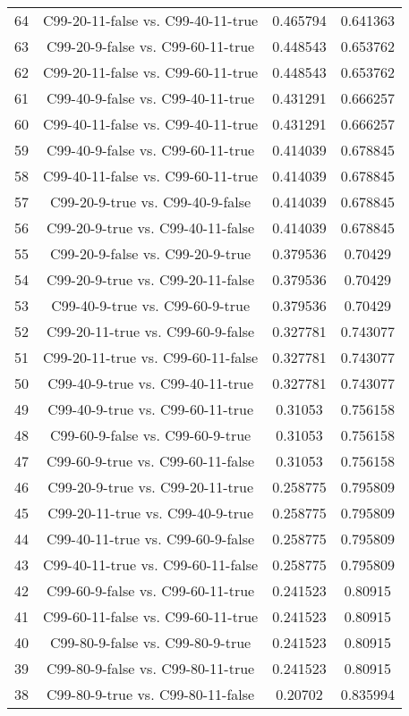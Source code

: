 \documentclass[a4paper,10pt]{article}
\begin{document}
\begin{landscape}
\begin{table}[!htp]
\begin{tabular}{cccc}
64&C99-20-11-false vs. C99-40-11-true&0.465794&0.641363\\
63&C99-20-9-false vs. C99-60-11-true&0.448543&0.653762\\
62&C99-20-11-false vs. C99-60-11-true&0.448543&0.653762\\
61&C99-40-9-false vs. C99-40-11-true&0.431291&0.666257\\
60&C99-40-11-false vs. C99-40-11-true&0.431291&0.666257\\
59&C99-40-9-false vs. C99-60-11-true&0.414039&0.678845\\
58&C99-40-11-false vs. C99-60-11-true&0.414039&0.678845\\
57&C99-20-9-true vs. C99-40-9-false&0.414039&0.678845\\
56&C99-20-9-true vs. C99-40-11-false&0.414039&0.678845\\
55&C99-20-9-false vs. C99-20-9-true&0.379536&0.70429\\
54&C99-20-9-true vs. C99-20-11-false&0.379536&0.70429\\
53&C99-40-9-true vs. C99-60-9-true&0.379536&0.70429\\
52&C99-20-11-true vs. C99-60-9-false&0.327781&0.743077\\
51&C99-20-11-true vs. C99-60-11-false&0.327781&0.743077\\
50&C99-40-9-true vs. C99-40-11-true&0.327781&0.743077\\
49&C99-40-9-true vs. C99-60-11-true&0.31053&0.756158\\
48&C99-60-9-false vs. C99-60-9-true&0.31053&0.756158\\
47&C99-60-9-true vs. C99-60-11-false&0.31053&0.756158\\
46&C99-20-9-true vs. C99-20-11-true&0.258775&0.795809\\
45&C99-20-11-true vs. C99-40-9-true&0.258775&0.795809\\
44&C99-40-11-true vs. C99-60-9-false&0.258775&0.795809\\
43&C99-40-11-true vs. C99-60-11-false&0.258775&0.795809\\
42&C99-60-9-false vs. C99-60-11-true&0.241523&0.80915\\
41&C99-60-11-false vs. C99-60-11-true&0.241523&0.80915\\
40&C99-80-9-false vs. C99-80-9-true&0.241523&0.80915\\
39&C99-80-9-false vs. C99-80-11-true&0.241523&0.80915\\
38&C99-80-9-true vs. C99-80-11-false&0.20702&0.835994\\

\end{tabular}
\end{table}
\end{landscape}
\end{document}
